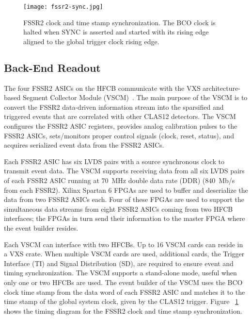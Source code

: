 \begin{figure}[hbt] 
\centering 
\texttt{[image: fssr2-sync.jpg]}
\caption{FSSR2 clock and time stamp synchronization. The BCO clock is halted when SYNC is asserted and started
  with its rising edge aligned to the global trigger clock rising edge. }
\label{fig:fssr2-sync}
\end{figure}

\subsection{Back-End Readout}

The four FSSR2 ASICs on the HFCB communicate with the VXS architecture-based Segment Collector Module
(VSCM)~\cite{trigger-nim}. The main purpose of the VSCM is to convert the FSSR2 data-driven information
stream into the sparsified and triggered events that are correlated with other CLAS12 detectors. The VSCM
configures the FSSR2 ASIC registers, provides analog calibration pulses to the FSSR2 ASICs, sets/monitors
proper control signals (clock, reset, status), and acquires serialized event data from the FSSR2 ASICs.

Each FSSR2 ASIC has six LVDS pairs with a source synchronous clock to transmit event data. The VSCM supports
receiving data from all six LVDS pairs of each FSSR2 ASIC running at 70~MHz double data rate (DDR) (840~Mb/s
from each FSSR2). Xilinx Spartan 6 FPGAs are used to buffer and deserialize the data from two FSSR2 ASICs each.
Four of these FPGAs are used to support the simultaneous data streams from eight FSSR2 ASICs coming from two
HFCB interfaces; the FPGAs in turn send their information to the master FPGA where the event builder resides.

Each VSCM can interface with two HFCBs. Up to 16 VSCM cards can reside in a VXS crate. When multiple VSCM cards
are used, additional cards, the Trigger Interface (TI) and Signal Distribution (SD), are required to ensure event and
timing synchronization. The VSCM supports a stand-alone mode, useful when only one or two HFCBs are used. The event
builder of the VSCM uses the BCO clock time stamp from the data word of each FSSR2 ASIC and matches it to the
time stamp of the global system clock, given by the CLAS12 trigger. Figure ~\ref{fig:fssr2-sync} shows the timing
diagram for the FSSR2 clock and time stamp synchronization.

